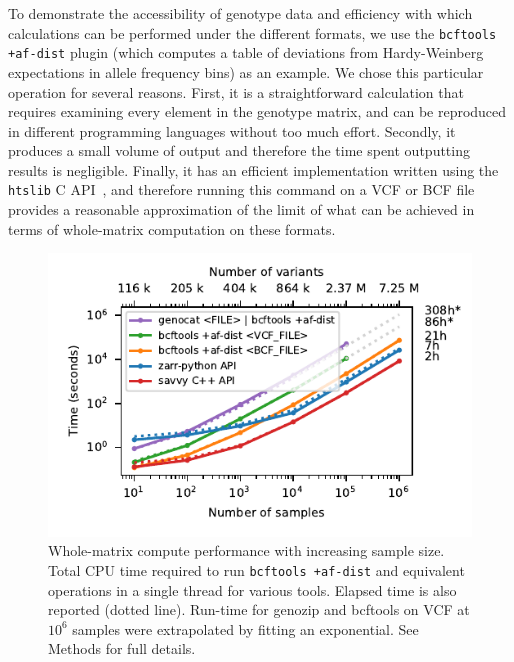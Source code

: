 \documentclass[a4paper,num-refs]{oup-contemporary}
\begin{document}
To demonstrate the accessibility of genotype data and efficiency with
which calculations can be performed under the different formats,
we use the \texttt{bcftools +af-dist} plugin
(which computes a table of
deviations from Hardy-Weinberg expectations in
allele frequency bins) as an example.
We chose this particular operation for several reasons.
First, it is a straightforward calculation that
requires examining every element in the genotype matrix,
and can be reproduced in different programming languages
without too much effort.
Secondly, it produces a small volume of output  and therefore the
time spent outputting results is negligible.
Finally, it has an efficient implementation written using the
\texttt{htslib} C API~\citep{bonfield2021htslib},
and therefore running this command on a VCF or BCF file provides
a reasonable approximation of the limit of what can be achieved in terms
of whole-matrix computation on these formats.

\begin{figure}
\includegraphics{figures/whole-matrix-compute}
\caption{Whole-matrix compute performance with increasing sample size.
Total CPU time required to run \texttt{bcftools +af-dist}
and equivalent operations in a single thread for various tools.
Elapsed time is also reported (dotted line). Run-time for genozip
and bcftools on VCF
at $10^6$ samples were extrapolated by fitting an exponential.
See Methods for full details.
\label{fig-whole-matrix-compute}}
\end{figure}
\end{document}
